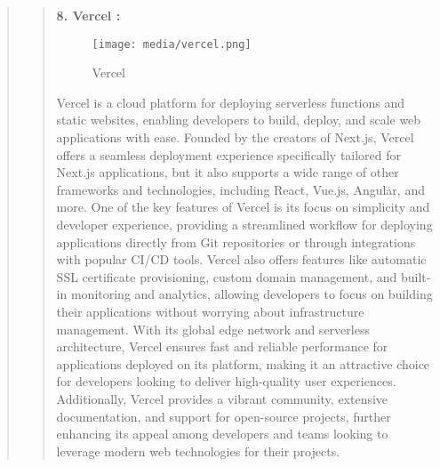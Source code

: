 \documentclass[12pt]{report}
\begin{document}
\begin{quote}
		\begin{quote}
			\textbf{8. Vercel :}\\
			\begin{figure}
				\centering
				\texttt{[image: media/vercel.png]}\\
				\caption{Vercel}
			\end{figure}
			Vercel is a cloud platform for deploying serverless functions and static websites, enabling developers to build, deploy, and scale web applications with ease. Founded by the creators of Next.js, Vercel offers a seamless deployment experience specifically tailored for Next.js applications, but it also supports a wide range of other frameworks and technologies, including React, Vue.js, Angular, and more. One of the key features of Vercel is its focus on simplicity and developer experience, providing a streamlined workflow for deploying applications directly from Git repositories or through integrations with popular CI/CD tools. Vercel also offers features like automatic SSL certificate provisioning, custom domain management, and built-in monitoring and analytics, allowing developers to focus on building their applications without worrying about infrastructure management. With its global edge network and serverless architecture, Vercel ensures fast and reliable performance for applications deployed on its platform, making it an attractive choice for developers looking to deliver high-quality user experiences. Additionally, Vercel provides a vibrant community, extensive documentation, and support for open-source projects, further enhancing its appeal among developers and teams looking to leverage modern web technologies for their projects.
		\end{quote}
		\clearpage
		

\end{quote}
\end{document}
